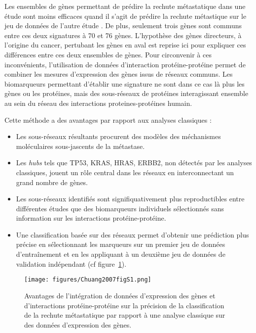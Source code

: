 			Les ensembles de gènes permettant de prédire la rechute métastatique dans une étude sont moins efficaces quand il s'agit de prédire la rechute métastique sur le jeu de données de l'autre étude \citep{EinDor2006}.
			De plus, seulement trois gènes sont communs entre ces deux signatures à 70 et 76 gènes.
			L'hypothèse des gènes directeurs, à l'origine du cancer, pertubant les gènes en aval est reprise ici pour expliquer ces différences entre ces deux ensembles de gènes.
			Pour circonvenir à ces inconvénients, l'utilisation de données d'interaction protéine-protéine permet de combiner les mesures d'expression des gènes issus de réseaux communs.
			Les biomarqueurs permettant d'établir une signature ne sont dans ce cas là plus les gènes ou les protéines, mais des sous-réseaux de protéines interagissant ensemble au sein du réseau des interactions proteines-protéines humain.

			Cette méthode a des avantages par rapport aux analyses classiques :
			\begin{itemize}
				\item Les sous-réseaux résultants procurent des modèles des méchanismes moléculaires sous-jascents de la métastase.
				\item Les \emph{hubs} tels que \acs{TP53}, \acs{KRAS}, \acs{HRAS}, \acs{ERBB2}, non détectés par les analyses classiques, jouent un rôle central dans les réseaux en interconnectant un grand nombre de gènes.
				\item Les sous-réseaux identifiés sont signifiquativement plus reproductibles entre différentes études que des biomarqueurs individuels sélectionnés sans information sur les interactions protéine-protéine.
				\item Une classification basée sur des réseaux permet d'obtenir une prédiction plus précise en sélectionnant les marqueurs sur un premier jeu de données d'entraînement et en les appliquant à un deuxième jeu de données de validation indépendant (cf figure~\ref{fig:Chuang2007figS1}).
			\end{itemize}

			\begin{figure}
				\centering
				\texttt{[image: figures/Chuang2007figS1.png]}
				\caption{Avantages de l'intégration de données d'expression des gènes et d'interactions protéine-protéine sur la précision de la classification de la rechute métastatique par rapport à une analyse classique sur des données d'expression des gènes\citep{Chuang2007}.}
				\label{fig:Chuang2007figS1}
			\end{figure}

